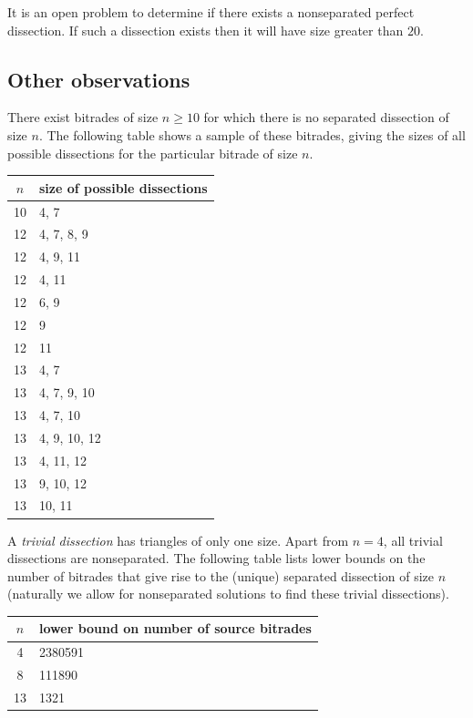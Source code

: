 \documentclass[12pt,amstags,fleqn]{article}
\theoremstyle{plain}
\theoremstyle{definition}
\begin{document}
It is an open problem to determine if there exists a nonseparated
perfect dissection. If such a dissection exists then it will have size
greater than $20$.

\subsection{Other observations}

There exist bitrades of size $n \geq 10$ for which there is no
separated dissection of size $n$. The following table shows a sample
of these bitrades, giving the sizes of all possible dissections for
the particular bitrade of size $n$.

\begin{center}
\begin{tabular}{|c|l|}
\hline
$n$ & size of possible dissections \\
\hline
\hline 10 & 4, 7  \\
\hline 12 & 4, 7, 8, 9  \\
\hline 12 & 4, 9, 11  \\
\hline 12 & 4, 11  \\
\hline 12 & 6, 9  \\
\hline 12 & 9  \\
\hline 12 & 11  \\
\hline 13 & 4, 7  \\
\hline 13 & 4, 7, 9, 10  \\
\hline 13 & 4, 7, 10  \\
\hline 13 & 4, 9, 10, 12  \\
\hline 13 & 4, 11, 12  \\
\hline 13 & 9, 10, 12  \\
\hline 13 & 10, 11  \\
\hline
\end{tabular}
\end{center}

A {\em trivial dissection} has triangles of only one size. Apart from
$n = 4$, all trivial dissections are nonseparated.  The following
table lists lower bounds on the number of bitrades that give rise to
the (unique) separated dissection of size $n$ (naturally we allow for
nonseparated solutions to find these trivial dissections).

\begin{center}
\begin{tabular}{|c|l|}
\hline
$n$ & lower bound on number of source bitrades \\
\hline
\hline 4 & 2380591 \\
\hline 8 & 111890 \\
\hline 13 & 1321 \\ 
\hline
\end{tabular}
\end{center}
\end{document}
